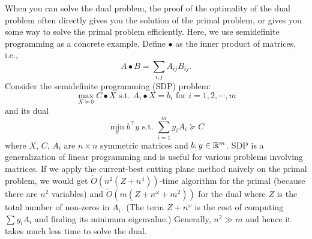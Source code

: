 When you can solve the dual problem, the proof of the optimality of
the dual problem often directly gives you the solution of the primal
problem, or gives you some way to solve the primal problem efficiently.
Here, we use semidefinite programming as a concrete example. Define
$\bullet$ as the inner product of matrices, i.e., 
\[
A\bullet B=\sum_{i,j}A_{ij}B_{ij}.
\]
Consider the semidefinite programming (SDP) problem:
\begin{equation}
\max_{X\succeq0}C\bullet X\text{ s.t. }A_{i}\bullet X=b_{i}\text{ for }i=1,2,\cdots,m\label{eq:SDP}
\end{equation}
and its dual
\begin{equation}
\min_{y}b^{\top}y\text{ s.t. }\sum^{m}_{i=1}y_{i}A_{i}\succeq C\label{eq:dual_SDP}
\end{equation}
where $X$, $C$, $A_{i}$ are $n\times n$ symmetric matrices and
$b,y\in\mathbb{R}^{m}$. SDP is a generalization of linear programming and is
useful for various problems involving matrices. If we apply the current-best
cutting plane method naively on the primal problem, we would get $\tilde{O}(n^{2}(Z+n^{4}))$-time
algorithm for the primal (because there are $n^{2}$ variables) and
$\tilde{O}(m(Z+n^{\omega}+m^{2}))$ for the dual where $Z$ is the
total number of non-zeros in $A_{i}$. (The term $Z+n^{\omega}$ is
the cost of computing $\sum y_{i}A_{i}$ and finding its minimum eigenvalue.)
Generally, $n^{2}\gg m$ and hence it takes much less time to solve
the dual.

